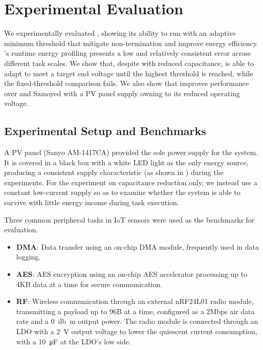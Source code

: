 \section{Experimental Evaluation} \label{sec:experiment}

We experimentally evaluated \nn{}, showing its ability to run with an adaptive minimum threshold that mitigate non-termination and improve energy efficiency. 
\nn{}'s runtime energy profiling presents a low and relatively consistent error across different task scales. 
We show that, despite with reduced capacitance, \nn{} is able to adapt  to meet a target end voltage  until the highest threshold is reached, while the fixed-threshold comparison \debs{} fails.
We also show that \nn{} improves performance over \debs{} and Samoyed with a PV panel supply owning to its reduced operating voltage. 

\subsection{Experimental Setup and Benchmarks}

A PV panel (Sanyo AM-1417CA) provided the sole power supply for the system. 
It is covered in a black box with a white LED light as the only energy source, producing a consistent supply characteristic (as shown in ) during the experiments.
For the experiment on capacitance reduction only, we instead use a constant low-current supply so as to examine whether the system is able to survive with little energy income during task execution. 

Three common peripheral tasks in IoT sensors were used as the benchmarks for evaluation. 
\begin{itemize}
    \item \textbf{DMA}: Data transfer using an on-chip DMA module, frequently used in data logging.
    \item \textbf{AES}: AES encryption using an on-chip AES accelerator processing up to 4KB data at a time for secure communication.
    \item \textbf{RF}:  Wireless communication through an external nRF24L01 radio module, transmitting a payload up to 96B at a time, configured as a 2Mbps air data rate and a \SI{0}{\decibel{m}} output power. 
    The radio module is connected through an LDO with a \SI{2}{\volt} output voltage to lower the quiescent current consumption, with a \SI{10}{\micro\farad} at the LDO's low side. 
\end{itemize}

